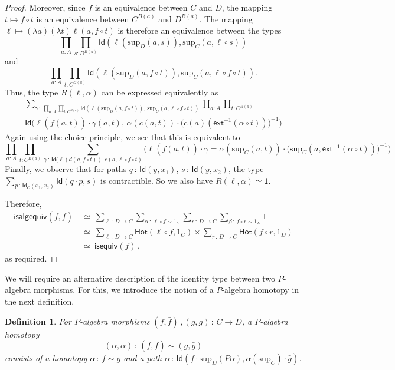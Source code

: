 \documentclass[10pt,a4paper,oneside,reqno]{amsart}
\theoremstyle{mythm}
\theoremstyle{mydef}
\newtheorem{definition}[theorem]{Definition}
\theoremstyle{myrmk}
\newcommand{\co}{\,{:}\,}
\newcommand{\com}{\circ}
\newcommand{\ct}{\cdot}
\newcommand{\isequiv}{\mathsf{isequiv}}
\newcommand{\Hot}{\mathsf{Hot}}
\newcommand{\ext}{\mathsf{ext}}
\newcommand{\one}{\mathsf{1}}
\newcommand{\Id}{\mathsf{Id}}
\renewcommand{\sup}{\mathrm{sup}}
\newcommand{\isalgequiv}{\mathsf{isalgequiv}}
\begin{document}
\begin{proof}
Moreover, since $f$ is an equivalence between $C$ and $D$, the mapping $t \mapsto f \com t$ is an equivalence between $C^{B(a)}$ and $D^{B(a)}$. The mapping $\bar{\ell} \mapsto (\lambda a) (\lambda t) \bar{\ell}(a,f \com t)$ is therefore an equivalence between the types $$\prod_{a:A}\prod_{s: D^{B(a)}}\Id(\ell(\sup_D(a,s)), \sup_C(a,\ell \com s))$$ and $$ \prod_{a:A}\prod_{t: C^{B(a)}} \Id(\ell(\sup_D(a,f \com t)), \sup_C(a,\ell \com f \com t)).$$ 
Thus, the type $R(\ell,\alpha)$ can be expressed equivalently as
\[
\begin{split}
\sum_{\gamma \co \prod_{a:A}\prod_{t: C^{B(a)}} \Id(\ell(\sup_D(a,f \circ t)),\, \sup_C(a,\ell \circ f \circ t))}
	 \prod_{a:A}\prod_{t: C^{B(a)}}\\
	\Id\big(\ell(\bar{f}(a,t)) \ct \gamma(a,t),\, \alpha(c(a,t)) \ct \big(c(a)(\ext^{-1}(\alpha \circ t))\big)^{-1}\big)
\end{split}
\]
Again using the choice principle, we see that this is equivalent to
\[ 
 \prod_{a:A}\prod_{t: C^{B(a)}}
 \sum_{\gamma \co \Id(\ell(d(a,f \circ t)), c(a,\ell \circ f \circ t)}
  \big(\ell(\bar{f}(a,t)) \ct \gamma = \alpha(\sup_C(a,t)) \ct \big(\sup_C(a, \ext^{-1}(\alpha \circ t))\big)^{-1}\big) 
  \]
Finally, we observe that for paths $q \co \Id(y,x_1)$, $s \co \Id(y,x_2)$, the type $\sum_{ p \co \Id_C(x_1,x_2)} \Id(q \ct p,s)$ is contractible. So we also have $R(\ell,\alpha) \simeq \one$. 

Therefore,
\begin{align*} 
\isalgequiv(f,\bar{f})\ 
  & \simeq\  \sum_{\ell \co D \to C} \sum_{ \alpha \co \ell \com f \sim 1_C} \sum_{ r  \co D \to C}
\sum_{\beta \co f \com r \sim 1_D} 1 \\
 & \simeq\ \sum_{\ell \co D \to C} \Hot( \ell \com f,1_C )\times 
		\sum_{r  \co D \to C} \Hot( f \com r, 1_D)  \\
 & \simeq\ \isequiv(f) \, ,
\end{align*} 
as required.
\end{proof}







We will require an alternative description of the identity type between two $P$-algebra morphisms. For this, we introduce 
the notion of a $P$-algebra homotopy in the next definition.


\begin{definition}
For $P$-algebra morphisms $(f, \bar{f}) \, , (g, \bar{g}) \co C \to D$, a \emph{$P$-algebra homotopy}  
\[
(\alpha, \bar{\alpha}) \co (f, \bar{f}) \sim (g, \bar{g})
\] 
consists of a homotopy $\alpha \co f \sim g$ and a path
$\bar{\alpha} \co \Id( \bar{f} \cdot \sup_D (P \alpha) ,  \alpha(\sup_C)\cdot \bar{g})$. 
\end{definition}
\end{document}

